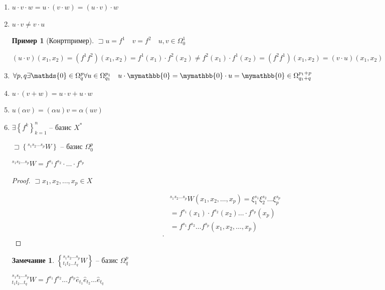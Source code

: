 \documentclass{book}
\theoremstyle{definition}
\newtheorem*{note}{Замечание}
\newtheorem*{example}{Пример}
\begin{document}
\begin{enumerate}
    \item $u\cdot v\cdot w = u\cdot \left( v\cdot w \right)  = \left( u\cdot v \right) \cdot w$
    \item $u\cdot v\neq v\cdot u$
        \begin{example}
            [Конртпример] $\sqsupset u = f^1\quad v = f^2\quad u, v\in \Omega^1_0$

            $\left( u\cdot v \right) \left( x_1, x_2 \right) =\left( f^1f^2 \right) \left( x_1, x_2 \right) = f^1(x_1)\cdot f^2(x_2) \neq f^2(x_1)\cdot f^1(x_2) = \left( f^2f^1 \right) (x_1, x_2) = \left( v\cdot u \right) \left( x_1, x_2 \right) $
        \end{example}
    \item $\forall p, q\exists \mathds{0}\in\Omega_q^p \forall u\in \Omega^{p_1}_{q_1}\quad u\cdot \mymathbb{0} = \mymathbb{0}\cdot u = \mymathbb{0}\in\Omega_{q_1+q}^{p_1+p}$
    \item $u\cdot \left( v+w \right)  = u\cdot v+u\cdot w$
    \item $u\left( \alpha v \right)  = \left( \alpha u \right) v = \alpha\left( uv \right) $
    \item $\exists \left\{ f^k \right\} _{k=1}^n$ -- базис $X^*$

        $\sqsupset \left\{ ^{s_1 s_2 \ldots s_p}W \right\} $ -- базис $\Omega_0^p$

        $^{s_1s_2\ldots s_p}W = f^{s_1}f^{s_2}\cdot \ldots\cdot f^{s_p}$
        \begin{proof}
            $\sqsupset x_1, x_2, \ldots, x_p\in X$

            \begin{align*}
                &^{s_1s_2 \ldots s_p}W\left( x_1, x_2, \ldots, x_p \right)  = \xi_1^{s_1}\xi_2^{s_2}\ldots\xi_p^{s_p}\\
                &= f^{s_1}(x_1)\cdot f^{s_2}(x_2)\ldots\cdot f^{s_p}(x_p) \\
                &= f^{s_1}f^{s_2}\ldots f^{s_p}\left( x_1, x_2, \ldots, x_p \right)  \\
           .\end{align*}
        \end{proof}
    \begin{note}
        $\left\{ ^{s_1 s_2 \ldots s_p}_{t_1 t_2 \ldots t_q}W \right\} $ -- базис $\Omega^p_q$

        $^{s_1 s_2 \ldots s_p}_{t_1 t_2 \ldots t_q}W = f^{s_1}f^{s_2}\ldots f^{s_p}\hat e_{t_1}\hat e_{t_2} \ldots \hat e_{t_q}$


\end{note}
\end{enumerate}
\end{document}
